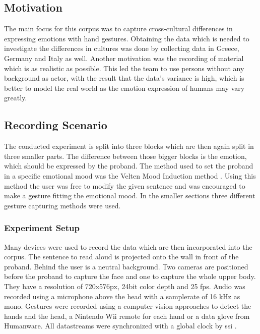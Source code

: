 \documentclass[a4paper]{article}
\begin{document}
		\subsection{Motivation}
			The main focus for this corpus was to capture cross-cultural differences in expressing emotions with hand gestures. Obtaining the data which is needed to investigate the differences in cultures was done by collecting data in Greece, Germany and Italy as well. Another motivation was the recording of material which is as realistic as possible. This led the team to use persons without any background as actor, with the result that the data's variance is high, which is better to model the real world as the emotion expression of humans may vary greatly.
		\subsection{Recording Scenario}
			The conducted experiment is split into three blocks which are then again split in three smaller parts. The difference between those bigger blocks is the emotion, which should be expressed by the proband. The method used to set the proband in a specific emotional mood was the Velten Mood Induction method \cite{VeltenJr1968473}. Using this method the user was free to modify the given sentence and was encouraged to make a gesture fitting the emotional mood. In the smaller sections three different gesture capturing methods were used.
		\subsubsection{Experiment Setup}
			Many devices were used to record the data which are then incorporated into the corpus. The sentence to read aloud is projected onto the wall in front of the proband. Behind the user is a neutral background. Two cameras are positioned before the proband to capture the face and one to capture the whole upper body. They have a resolution of 720x576px, 24bit color depth and 25 fps. Audio was recorded using a microphone above the head with a samplerate of 16 kHz as mono. Gestures were recorded using a computer vision approaches to detect the hands and the head, a Nintendo Wii remote for each hand or a data glove from Humanware. All datastreams were synchronized with a global clock by \gls{ssi} \cite{SmartSensorIntegration2010}.
\end{document}
